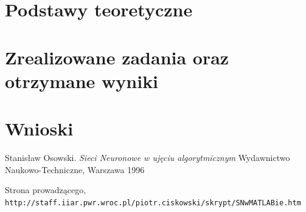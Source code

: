 \documentclass{article}
\begin{document}
\section{Podstawy teoretyczne}


\section{Zrealizowane zadania oraz otrzymane wyniki}


\section{Wnioski}



\newpage
\begin{thebibliography}{9}

Stanisław Osowski.
\textit{Sieci Neuronowe w ujęciu algorytmicznym}
Wydawnictwo Naukowo-Techniczne, Warszawa 1996

Strona prowadzącego,
\\\texttt{http://staff.iiar.pwr.wroc.pl/piotr.ciskowski/skrypt/SNwMATLABie.htm}

\end{thebibliography}
\end{document}
